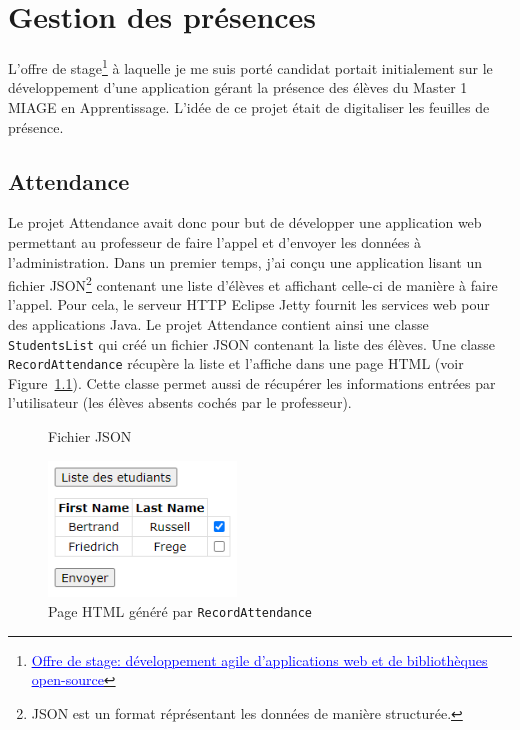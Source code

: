 \chapter[Gestion des présences]{Gestion des présences\raisebox{.3\baselineskip}{\normalsize\footnotemark}}

L'offre de stage\footnote{\href{https://github.com/Dauphine-MIDO/M1-app/blob/master/Stage dev.adoc}{\textcolor{blue}{\underline{Offre de stage: développement agile d’applications web et de bibliothèques open-source}}}} à laquelle je me suis porté candidat portait initialement sur le développement d'une application gérant la présence des élèves du Master 1 MIAGE en Apprentissage. L'idée de ce projet était de digitaliser les feuilles de présence.

\section{Attendance}

Le projet Attendance avait donc pour but de développer une application web permettant au professeur de faire l'appel et d'envoyer les données à l'administration. Dans un premier temps, j'ai conçu une application lisant un fichier JSON\footnote{JSON est un format réprésentant les données de manière structurée.} contenant une liste d'élèves et affichant celle-ci de manière à faire l'appel. Pour cela,  le serveur HTTP Eclipse Jetty fournit les services web pour des applications Java. Le projet Attendance contient ainsi une classe \texttt{StudentsList} qui créé un fichier JSON contenant la liste des élèves. Une classe \texttt{RecordAttendance} récupère la liste et l'affiche dans une page HTML (voir Figure~\ref{attendance}). Cette classe permet aussi de récupérer les informations entrées par l'utilisateur (les élèves absents cochés par le professeur).



\begin{figure}[h]
    \begin{minipage}{0.5\textwidth}
        
        \caption*{Fichier JSON}
        \label{json}
    \end{minipage}
    \begin{minipage}{0.5\textwidth}
        \begin{center}
            \includegraphics[width=5cm]{assets/attendance.PNG}
            \caption{Page HTML généré par \texttt{RecordAttendance}}
            \label{attendance}        
        \end{center}
    \end{minipage}
\end{figure}

